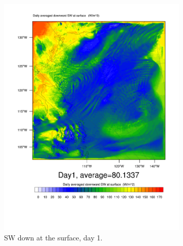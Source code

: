 \begin{figure}
\centering
	\begin{subfigure}{0.48\textwidth}
		\includegraphics[width=\textwidth]{results/control/SWDOWN_Day1.pdf}
		\caption{SW down at the surface, day 1.}
		\label{subfig:swdown_r1Day1}
	\end{subfigure}
	\quad
	\begin{subfigure}{0.48\textwidth}
		\centering

\end{subfigure}
\end{figure}

